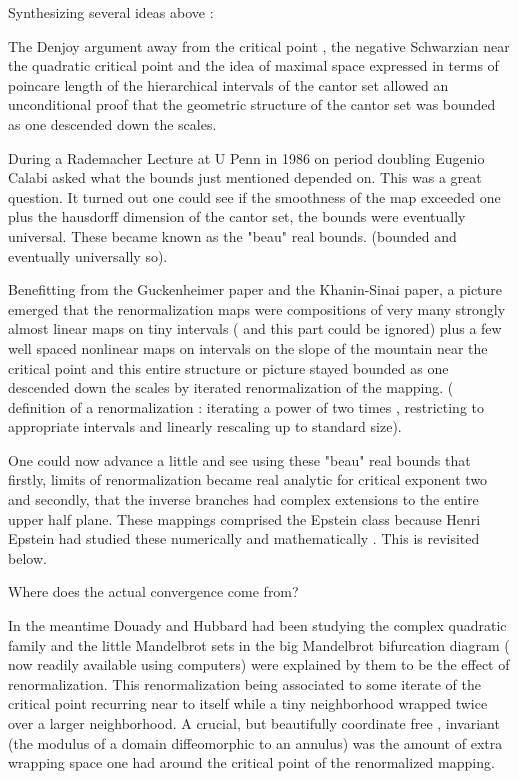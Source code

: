 \begin{description}
 Synthesizing several ideas above :

 The Denjoy argument away from the critical point ,   the negative Schwarzian near the quadratic critical point   and  the idea of  maximal  space  expressed in terms of  poincare length  of  the  hierarchical intervals of the cantor set  allowed  an unconditional  proof that the geometric structure of the cantor set was bounded as one descended down the scales.

 During a  Rademacher Lecture  at U Penn in 1986 on period doubling Eugenio Calabi asked  what the bounds just mentioned depended on. This was a  great question. It turned out  one could see  if the smoothness of the map exceeded one plus the hausdorff dimension of the cantor set, the bounds were eventually universal.
These became known as the "beau" real bounds.
(bounded and eventually universally so).

  Benefitting  from the Guckenheimer paper and the Khanin-Sinai paper, a picture emerged that the renormalization  maps  were compositions of  very many strongly almost linear maps on tiny intervals ( and this part could be  ignored) plus a few well spaced  nonlinear maps on intervals on the slope of the mountain near the critical point and this entire structure or picture stayed bounded as one descended down the scales  by  iterated renormalization of the mapping.
(  definition of a renormalization :  iterating a power of two times , restricting to  appropriate intervals  and linearly rescaling up to standard size).

One could  now  advance a little and see  using  these  "beau" real bounds that  firstly, limits of renormalization became real analytic for critical exponent two and secondly, that the inverse branches had complex extensions to the entire upper half plane. These  mappings comprised  the Epstein class because Henri Epstein had studied these numerically and mathematically . This is revisited below.


 Where does the  actual convergence come from?

In the meantime  Douady and  Hubbard  had been studying  the complex quadratic family and the little Mandelbrot sets in the  big Mandelbrot bifurcation diagram ( now readily available using computers) were explained by them to be the effect of renormalization. This  renormalization   being  associated to some  iterate of the critical point  recurring near to itself while a tiny neighborhood wrapped  twice over  a larger neighborhood.
 A crucial, but beautifully coordinate free , invariant (the modulus of a domain diffeomorphic to an annulus) was the amount of extra wrapping space one had around the critical point of the renormalized mapping.


\end{description}
